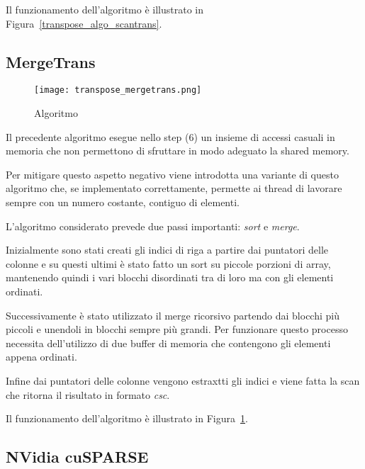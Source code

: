 Il funzionamento dell'algoritmo è illustrato in Figura~\ref{transpose_algo_scantrans}. 

\subsection{MergeTrans}

\begin{figure}[htbp]
    \centering
	\texttt{[image: transpose\_mergetrans.png]}
	\caption{Algoritmo \MergeTrans}
	\label{transpose_algo_mergerans}
\end{figure}
	
Il precedente algoritmo esegue nello step (6) un insieme di accessi casuali in memoria che non permettono di sfruttare in modo adeguato la shared memory. 

Per mitigare questo aspetto negativo viene introdotta una variante di questo algoritmo che, se implementato correttamente, permette ai thread di lavorare sempre con un numero costante, contiguo di elementi. 
	
L'algoritmo considerato prevede due passi importanti: \textit{sort} e \textit{merge}.

Inizialmente sono stati creati gli indici di riga a partire dai puntatori delle colonne e su questi ultimi è stato fatto un sort su piccole porzioni di array, mantenendo quindi i vari blocchi disordinati tra di loro ma con gli elementi ordinati. 

Successivamente è stato utilizzato il merge ricorsivo partendo dai blocchi più piccoli e unendoli in blocchi sempre più grandi. Per funzionare questo processo necessita dell'utilizzo di due buffer di memoria che contengono gli elementi appena ordinati. 

Infine dai puntatori delle colonne vengono estraxtti gli indici e viene fatta la scan che ritorna il risultato in formato \textit{csc}.

Il funzionamento dell'algoritmo è illustrato in Figura~\ref{transpose_algo_mergerans}. 


\subsection{NVidia cuSPARSE}

